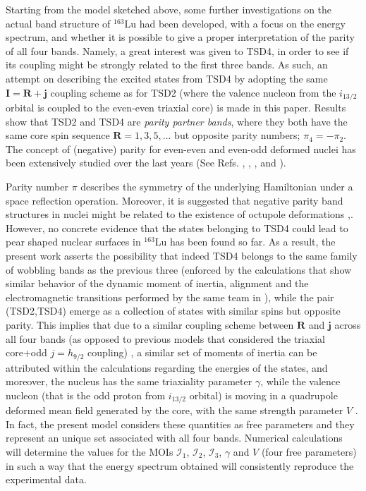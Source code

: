 \documentclass[%
 reprint,
 amsmath,
 amssymb,
 aps,
]{revtex4-2}
\begin{document}
Starting from the model sketched above, some further investigations on the actual band structure of $^{163}$Lu had been developed, with a focus on the energy spectrum, and whether it is possible to give a proper interpretation of the parity of all four bands. Namely, a great interest was given to TSD4, in order to see if its coupling might be strongly related to the first three bands. As such, an attempt on describing the excited states from TSD4 by adopting the same $\mathbf{I}=\mathbf{R}+\mathbf{j}$ coupling scheme as for TSD2 (where the valence nucleon from the $i_{13/2}$ orbital is coupled to the even-even triaxial core) is made in this paper. Results show that TSD2 and TSD4 are \emph{parity partner bands}, where they both have the same core spin sequence $\mathbf{R}=1,3,5,\dots$ but opposite parity numbers; $\pi_4=-\pi_2$. The concept of (negative) parity for even-even and even-odd deformed nuclei has been extensively studied over the last years (See Refs. \cite{raduta2006description}, \cite{raduta2006positive}, \cite{raduta2006simultaneous}, and \cite{bizzeti2008description}). 

Parity number $\pi$ describes the symmetry of the underlying Hamiltonian under a space reflection operation. Moreover, it is suggested that negative parity band structures in nuclei might be related to the existence of octupole deformations \cite{chasman1980incipient},\cite{asaro1953complex}. However, no concrete evidence that the states belonging to TSD4 could lead to pear shaped nuclear surfaces in $^{163}$Lu has been found so far. As a result, the present work asserts the possibility that indeed TSD4 belongs to the same family of wobbling bands as the previous three (enforced by the calculations that show similar behavior of the dynamic moment of inertia, alignment and the electromagnetic transitions performed by the same team in \cite{raduta2020towards}), while the pair (TSD2,TSD4) emerge as a collection of states with similar spins but opposite parity. This implies that due to a similar coupling scheme between $\mathbf{R}$ and $\mathbf{j}$ across all four bands (as opposed to previous models that considered the triaxial core+odd $j=h_{9/2}$ coupling) , a similar set of moments of inertia can be attributed within the calculations regarding the energies of the states, and moreover, the nucleus has the same triaxiality parameter $\gamma$, while the valence nucleon (that is the odd proton from $i_{13/2}$ orbital) is moving in a quadrupole deformed mean field generated by the core, with the same strength parameter $V$ \cite{shou2009coupling}. In fact, the present model considers these quantities as free parameters and they represent an unique set associated with all four bands. Numerical calculations will determine the values for the MOIs $\mathcal{I}_1$, $\mathcal{I}_2$, $\mathcal{I}_3$, $\gamma$ and $V$ (four free parameters) in such a way that the energy spectrum obtained will consistently reproduce the experimental data.
\end{document}
